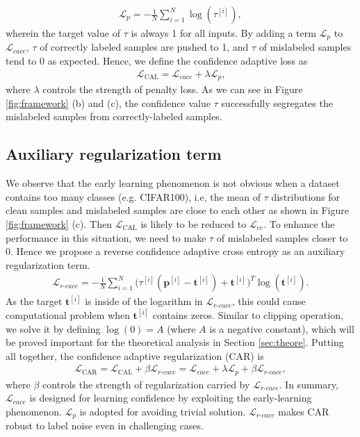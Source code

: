 \documentclass{article}
\begin{document}
\begin{align}
	\mathcal{L}_{p}=-\frac{1}{N}\sum_{i=1}^{N}\log(\tau^{[i]}), 
\end{align}
wherein the target value of $\tau$ is always 1 for all inputs. By adding a term $\mathcal{L}_{p}$ to $\mathcal{L}_{cace}$, $\tau$ of correctly labeled samples are pushed to 1, and $\tau$ of mislabeled samples tend to 0 as expected. Hence, we define the confidence adaptive loss as
\begin{align}
\label{eq:Lcal}
 \mathcal{L}_{\textrm{CAL}}=\mathcal{L}_{cace}+\lambda \mathcal{L}_{p}\text{,} 
\end{align}
where $\lambda$ controls the strength of penalty loss. As we can see in Figure \ref{fig:framework} (b) and (c), the confidence value $\tau$ successfully segregates the mislabeled samples from correctly-labeled samples.




\subsection{Auxiliary regularization term}
\label{sec:car}
We observe that the early learning phenomenon is not obvious when a dataset contains too many classes (e.g. CIFAR100), i.e, the mean of $\tau$ distributions for clean samples and mislabeled samples are close to each other as shown in Figure \ref{fig:framework} (c). Then $\mathcal{L}_\text{CAL}$ is likely to be reduced to $\mathcal{L}_{ce}$. To enhance the performance in this situation, we need to make $\tau$ of mislabeled samples closer to 0. Hence we propose a reverse confidence adaptive cross entropy as an auxiliary regularization term.
\begin{align}
	\mathcal{L}_{r\textrm{-}cace}=-\frac{1}{N}\sum_{i=1}^{N}\big(\tau^{[i]}(\bm{p}^{[i]}-\bm{t}^{[i]})+\bm{t}^{[i]}\big)^{T}\log(\bm{t}^{[i]}). 
\end{align}
As the target $\bm{t}^{[i]}$ is inside of the logarithm in $\mathcal{L}_{r\textrm{-}cace}$, this could cause computational problem when $\bm{t}^{[i]}$ contains zeros. Similar to clipping operation, we solve it by defining $\log(0)=A$ (where $A$ is a negative constant), which will be proved important for the theoretical analysis in Section \ref{sec:theore}. Putting all together, the confidence adaptive regularization (CAR) is
\begin{align}
\label{eq:car}
	\mathcal{L}_{\textrm{CAR}} = \mathcal{L}_{\textrm{CAL}} + \beta \mathcal{L}_{r\textrm{-}cace} =  \mathcal{L}_{cace} + \lambda \mathcal{L}_{p} + \beta \mathcal{L}_{r\textrm{-}cace}, 
\end{align}
where $\beta$ controls the strength of regularization carried by $\mathcal{L}_{r\textrm{-}cace}$. In summary, $\mathcal{L}_{cace}$ is designed for learning confidence by exploiting the early-learning phenomenon. $\mathcal{L}_{p}$ is adopted for avoiding trivial solution. $\mathcal{L}_{r\textrm{-}cace}$ makes CAR robust to label noise even in challenging cases. 
\end{document}
